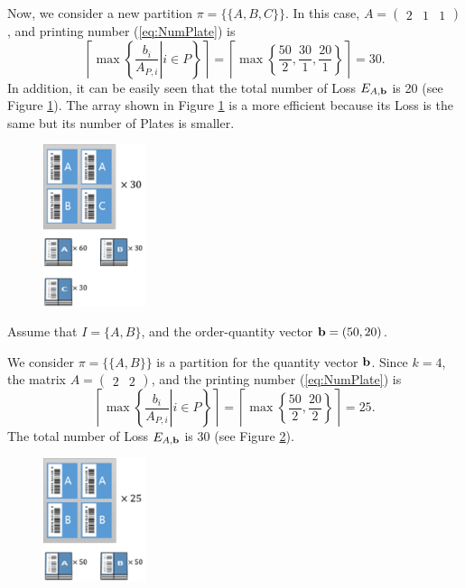 \documentclass[review]{elsarticle}
\begin{document}
	Now, we consider a new partition $\pi = \{\{A, B, C\}\}$. In this case, $A = (\begin{array}{ccc}2 & 1 & 1 \end{array})$, and printing number (\ref{eq:NumPlate}) is 
	\begin{equation}
	\left\lceil \max\left\{ \left. \frac{b_{i}}{A_{P,i}} \right| i \in P \right\} \right\rceil = \left\lceil \max \left\{ \frac{50}{2}, \frac{30}{1}, \frac{20}{1} \right\} \right\rceil = 30.
	\end{equation}
	In addition, it can be easily seen that the total number of Loss $E_{A,{\bf b}}$ is 20 (see Figure \ref{fig:ex12}).
	The array shown in Figure \ref{fig:ex12} is a more efficient because its Loss is the same but its number of Plates is smaller.
	\begin{figure}[h!]
		\centering
		\includegraphics[width=3cm]{ex12.pdf}
		\caption{}
		\label{fig:ex12}       %
	\end{figure}

	Assume that $I=\{A,B\}$, and the order-quantity vector ${\bf b}=(50,20)$.
	
	We consider $\pi = \{\{A,B\}\}$ is a partition for the quantity vector ${\bf b}$. Since $k = 4$, 
	the matrix $A = (\begin{array}{cc}2 & 2\end{array})$, and the printing number (\ref{eq:NumPlate}) is 
	\begin{equation}
	\left\lceil \max\left\{ \left. \frac{b_{i}}{A_{P,i}} \right| i \in P \right\} \right\rceil = \left\lceil \max \left\{ \frac{50}{2}, \frac{20}{2} \right\} \right\rceil = 25.
	\end{equation}
	The total number of Loss $E_{A,{\bf b}}$ is 30 (see Figure \ref{fig:ex21}).
	
	\begin{figure}[h!]
		\centering
		\includegraphics[width=3cm]{ex21.pdf}
		\caption{}
		\label{fig:ex21}       %
	\end{figure}
	
\end{document}
